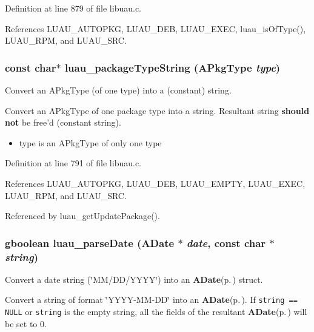 Definition at line 879 of file libuau.c.

References LUAU\_\-AUTOPKG, LUAU\_\-DEB, LUAU\_\-EXEC, luau\_\-is\-Of\-Type(), LUAU\_\-RPM, and LUAU\_\-SRC.
\subsubsection{\setlength{\rightskip}{0pt plus 5cm}const char$\ast$ luau\_\-package\-Type\-String ({\bf APkg\-Type} {\em type})}\label{libuau_8c_a24}


Convert an APkg\-Type (of one type) into a (constant) string. 

Convert an APkg\-Type of one package type into a string. Resultant string {\bf should not} be free'd (constant string).

\begin{itemize}
\item type is an APkg\-Type of only one type 
\end{itemize}


Definition at line 791 of file libuau.c.

References LUAU\_\-AUTOPKG, LUAU\_\-DEB, LUAU\_\-EMPTY, LUAU\_\-EXEC, LUAU\_\-RPM, and LUAU\_\-SRC.

Referenced by luau\_\-get\-Update\-Package().
\subsubsection{\setlength{\rightskip}{0pt plus 5cm}gboolean luau\_\-parse\-Date ({\bf ADate} $\ast$ {\em date}, const char $\ast$ {\em string})}\label{libuau_8c_a19}


Convert a date string (\char`\"{}MM/DD/YYYY\char`\"{}) into an {\bf ADate}{\rm (p.\,\pageref{structADate})} struct. 

Convert a string of format \char`\"{}YYYY-MM-DD\char`\"{} into an {\bf ADate}{\rm (p.\,\pageref{structADate})}. If {\tt string == NULL} or {\tt string} is the empty string, all the fields of the resultant {\bf ADate}{\rm (p.\,\pageref{structADate})} will be set to 0.

